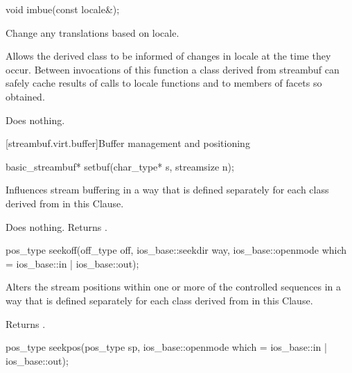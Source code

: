 %
\begin{itemdecl}
void imbue(const locale&);
\end{itemdecl}

\begin{itemdescr}
\pnum
\effects
Change any translations based on locale.

\pnum
\remarks
Allows the derived class to be informed of changes in locale at the
time they occur.
Between invocations of this function a class derived
from streambuf can safely cache results of calls to locale functions
and to members of facets so obtained.

\pnum
{}
Does nothing.
\end{itemdescr}

[streambuf.virt.buffer]{Buffer management and positioning}

%
\begin{itemdecl}
basic_streambuf* setbuf(char_type* s, streamsize n);
\end{itemdecl}

\begin{itemdescr}
\pnum
\effects
Influences stream buffering in a way that is defined separately for each class
derived from
in this Clause.

\pnum
{}
Does nothing.
Returns
.
\end{itemdescr}

%
\begin{itemdecl}
pos_type seekoff(off_type off, ios_base::seekdir way,
                 ios_base::openmode which
                   = ios_base::in | ios_base::out);
\end{itemdecl}

\begin{itemdescr}
\pnum
\effects
Alters the stream positions within one or more of
the controlled sequences in a way that is defined separately for each class
derived from
in this Clause.

\pnum
{}
Returns
.
\end{itemdescr}

%
\begin{itemdecl}
pos_type seekpos(pos_type sp,
                 ios_base::openmode which
                   = ios_base::in | ios_base::out);
\end{itemdecl}

